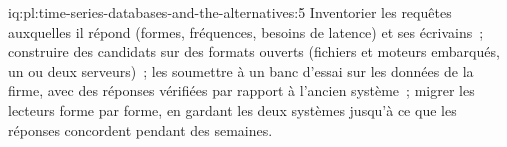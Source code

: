 \begin{solution}{iq:pl:time-series-databases-and-the-alternatives:5}
Inventorier les requêtes auxquelles il répond (formes, fréquences, besoins de latence) et ses écrivains~; construire des candidats sur des formats ouverts (fichiers
et moteurs embarqués, un ou deux serveurs)~; les soumettre à un banc d'essai sur les données de la firme, avec des réponses vérifiées par rapport à l'ancien système~;
migrer les lecteurs forme par forme, en gardant les deux systèmes jusqu'à ce que les réponses concordent pendant des semaines.
\end{solution}
